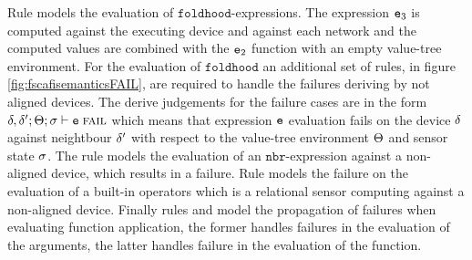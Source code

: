 Rule  models the evaluation of $\mathtt{foldhood}$-expressions. The expression $\mathtt{e}_3$ is computed against the executing device and against each network and the computed values are combined with the $\mathtt{e}_2$ function with an empty value-tree environment. For the evaluation of $\mathtt{foldhood}$ an additional set of rules, in figure \ref{fig:fscafisemanticsFAIL}, are required to handle the failures deriving by not aligned devices. The derive judgements for the failure cases are in the form $\delta,\delta';\Theta;\sigma\vdash \mathtt{e}\;\textup{\textsc{fail}}$ which means that expression $\mathtt{e}$ evaluation fails on the device $\delta$ against neightbour $\delta'$ with respect to the value-tree environment $\Theta$ and sensor state $\sigma$. The rule  models the evaluation of an $\mathtt{nbr}$-expression against a non-aligned device, which results in a failure. Rule  models the failure on the evaluation of a built-in operators which is a relational sensor computing against a non-aligned device. Finally rules  and  model the propagation of failures when evaluating function application, the former handles failures in the evaluation of the arguments, the latter handles failure in the evaluation of the function.

